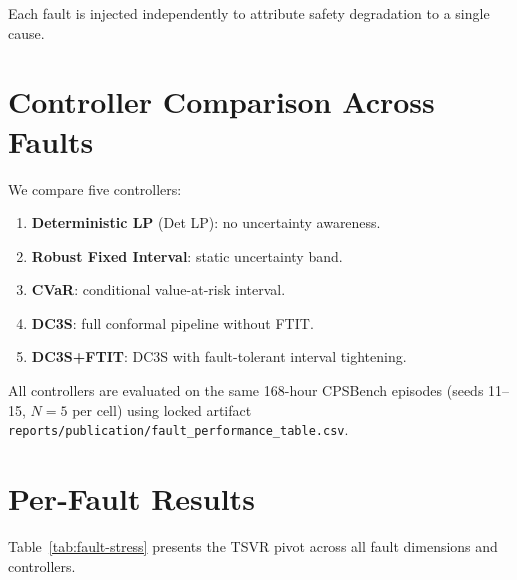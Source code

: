 Each fault is injected independently to attribute safety degradation
to a single cause.

\section{Controller Comparison Across Faults}

We compare five controllers:
\begin{enumerate}
  \item \textbf{Deterministic LP} (Det LP): no uncertainty awareness.
  \item \textbf{Robust Fixed Interval}: static uncertainty band.
  \item \textbf{CVaR}: conditional value-at-risk interval.
  \item \textbf{DC3S}: full conformal pipeline without FTIT.
  \item \textbf{DC3S+FTIT}: DC3S with fault-tolerant interval tightening.
\end{enumerate}

All controllers are evaluated on the same 168-hour CPSBench episodes
(seeds 11--15, $N=5$ per cell) using locked artifact
\texttt{reports/publication/fault\_performance\_table.csv}.

\section{Per-Fault Results}

Table~\ref{tab:fault-stress} presents the TSVR pivot across all fault
dimensions and controllers.

